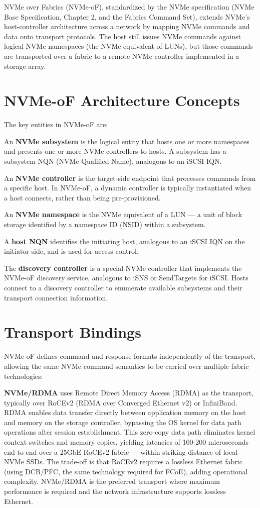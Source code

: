 NVMe over Fabrics (NVMe-oF), standardized by the NVMe specification (NVMe Base Specification, Chapter 2, and the Fabrics Command Set), extends NVMe's host-controller architecture across a network by mapping NVMe commands and data onto transport protocols. The host still issues NVMe commands against logical NVMe namespaces (the NVMe equivalent of LUNs), but those commands are transported over a fabric to a remote NVMe controller implemented in a storage array.

\section{NVMe-oF Architecture Concepts}
The key entities in NVMe-oF are:

An \textbf{NVMe subsystem} is the logical entity that hosts one or more namespaces and presents one or more NVMe controllers to hosts. A subsystem has a subsystem NQN (NVMe Qualified Name), analogous to an iSCSI IQN.

An \textbf{NVMe controller} is the target-side endpoint that processes commands from a specific host. In NVMe-oF, a dynamic controller is typically instantiated when a host connects, rather than being pre-provisioned.

An \textbf{NVMe namespace} is the NVMe equivalent of a LUN --- a unit of block storage identified by a namespace ID (NSID) within a subsystem.

A \textbf{host NQN} identifies the initiating host, analogous to an iSCSI IQN on the initiator side, and is used for access control.

The \textbf{discovery controller} is a special NVMe controller that implements the NVMe-oF discovery service, analogous to iSNS or SendTargets for iSCSI. Hosts connect to a discovery controller to enumerate available subsystems and their transport connection information.

\section{Transport Bindings}
NVMe-oF defines command and response formats independently of the transport, allowing the same NVMe command semantics to be carried over multiple fabric technologies:

\textbf{NVMe/RDMA} uses Remote Direct Memory Access (RDMA) as the transport, typically over RoCEv2 (RDMA over Converged Ethernet v2) or InfiniBand. RDMA enables data transfer directly between application memory on the host and memory on the storage controller, bypassing the OS kernel for data path operations after session establishment. This zero-copy data path eliminates kernel context switches and memory copies, yielding latencies of 100-200 microseconds end-to-end over a 25GbE RoCEv2 fabric --- within striking distance of local NVMe SSDs. The trade-off is that RoCEv2 requires a lossless Ethernet fabric (using DCB/PFC, the same technology required for FCoE), adding operational complexity. NVMe/RDMA is the preferred transport where maximum performance is required and the network infrastructure supports lossless Ethernet.

